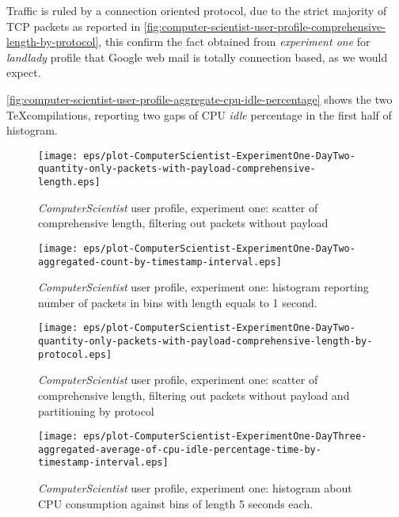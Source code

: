 \documentclass[10pt,a4paper]{article}
\begin{document}
    Traffic is ruled by a connection oriented protocol, due to the
    strict majority of TCP packets as reported in
    \autoref{fig:computer-scientist-user-profile-comprehensive-length-by-protocol},
    this confirm the fact obtained from \emph{experiment one} for
    \emph{landlady} profile that Google web mail is totally connection
    based, as we would expect.
    
    \autoref{fig:computer-scientist-user-profile-aggregate-cpu-idle-percentage}
    shows the two \TeX compilations, reporting two gaps of CPU
    \emph{idle} percentage in the first half of histogram.


    \begin{figure}
      \centering
      \texttt{[image: eps/plot-ComputerScientist-ExperimentOne-DayTwo-quantity-only-packets-with-payload-comprehensive-length.eps]}
      \caption{\emph{ComputerScientist} user profile, experiment one: scatter
        of comprehensive length, filtering out packets without
        payload}
      \label{fig:computer-scientist-user-profile-comprehensive-length-scatter-filtering-on-payload}
    \end{figure}

    \begin{figure}
      \centering
      \texttt{[image: eps/plot-ComputerScientist-ExperimentOne-DayTwo-aggregated-count-by-timestamp-interval.eps]}
      \caption{\emph{ComputerScientist} user profile, experiment one: histogram
        reporting number of packets in bins with length equals to 1
        second.}
      \label{fig:computer-scientist-user-profile-exp-one-count-histogram}
    \end{figure}

    \begin{figure}
      \centering
      \texttt{[image: eps/plot-ComputerScientist-ExperimentOne-DayTwo-quantity-only-packets-with-payload-comprehensive-length-by-protocol.eps]}
      \caption{\emph{ComputerScientist} user profile, experiment one: scatter
        of comprehensive length, filtering out packets without payload
        and partitioning by protocol}
      \label{fig:computer-scientist-user-profile-comprehensive-length-by-protocol}
    \end{figure}


    \begin{figure}
      \centering
      \texttt{[image: eps/plot-ComputerScientist-ExperimentOne-DayThree-aggregated-average-of-cpu-idle-percentage-time-by-timestamp-interval.eps]}
      \caption{\emph{ComputerScientist} user profile, experiment one:
        histogram about CPU consumption against bins of length 5
        seconds each.}
      \label{fig:computer-scientist-user-profile-aggregate-cpu-idle-percentage}
    \end{figure}
\end{document}
